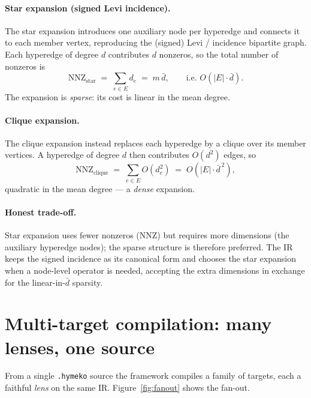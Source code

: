 \documentclass[11pt]{article}
\begin{document}
\paragraph{Star expansion (signed Levi incidence).}
The star expansion introduces one auxiliary node per hyperedge and connects it to
each member vertex, reproducing the (signed) Levi / incidence bipartite graph.
Each hyperedge of degree $d$ contributes $d$ nonzeros, so the total number of
nonzeros is
\[
\mathrm{NNZ}_{\text{star}} \;=\; \sum_{e \in E} d_e \;=\; m\,\bar{d},
\qquad \text{i.e. } O(|E|\cdot \bar{d}).
\]
The expansion is \emph{sparse}: its cost is linear in the mean degree.

\paragraph{Clique expansion.}
The clique expansion instead replaces each hyperedge by a clique over its member
vertices. A hyperedge of degree $d$ then contributes $O(d^2)$ edges, so
\[
\mathrm{NNZ}_{\text{clique}} \;=\; \sum_{e \in E} O(d_e^2)
\;=\; O(|E|\cdot \bar{d}^{\,2}),
\]
quadratic in the mean degree --- a \emph{dense} expansion.

\paragraph{Honest trade-off.}
Star expansion uses fewer nonzeros (NNZ) but requires more dimensions (the
auxiliary hyperedge nodes); the sparse structure is therefore preferred. The IR
keeps the signed incidence as its canonical form and chooses the star expansion
when a node-level operator is needed, accepting the extra dimensions in exchange
for the linear-in-$\bar{d}$ sparsity.

\section{Multi-target compilation: many lenses, one source}
\label{sec:targets}
From a single \texttt{.hymeko} source the framework compiles a family of targets,
each a faithful \emph{lens} on the same IR. Figure~\ref{fig:fanout} shows the
fan-out.
\end{document}
